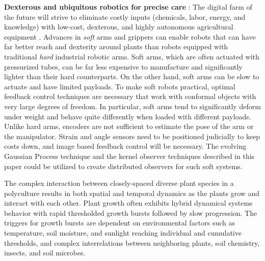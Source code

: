 \documentclass[letterpaper,12pt,peerreviewca,draftcls]{IEEEtran}
\begin{document}

\textbf{Dexterous and ubiquitous robotics for precise care} : The digital farm of the future will strive to eliminate costly inputs (chemicals, labor, energy, and knowledge) with low-cost, dexterous, and highly autonomous agricultural equipment \cite{pedersen2006agricultural}. Advances in \textit{soft} arms and grippers can enable robots that can have far better reach and dexterity around plants than robots equipped with traditional \textit{hard} industrial robotic arms. Soft arms, which are often actuated with pressurized tubes, can be far less expensive to manufacture and significantly lighter than their hard counterparts. On the other hand, soft arms can be slow to actuate and have limited payloads. To make soft robots practical, optimal feedback control techniques are necessary that work with conformal objects with very large degrees of freedom. In particular, soft arms tend to significantly deform under weight and behave quite differently when loaded with different payloads. Unlike hard arms, encoders are not sufficient to estimate the pose of the arm or the manipulator. Strain and angle sensors need to be positioned judicially to keep costs down, and image based feedback control will be necessary. The evolving Gaussian Process technique and the kernel observer techniques described in this paper could be utilized to create distributed observers for such soft systems.  

The complex interaction between closely-spaced diverse plant species in a polyculture results in both spatial and temporal dynamics as the plants grow and interact with each other. %
Plant growth often exhibits hybrid dynamical systems behavior with rapid thresholded growth bursts followed by slow progression. The triggers for growth bursts are dependent on  environmental factors such as temperature, soil moisture, and sunlight reaching individual and cumulative thresholds, and complex interrelations between neighboring plants, soil chemistry, insects, and soil microbes. 
\end{document}
